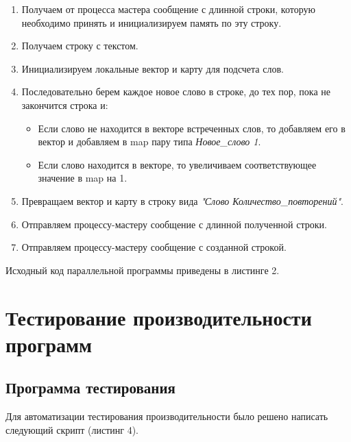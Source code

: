 \documentclass[12pt,a4paper]{report}
\begin{document}
\begin{enumerate}
							\begin{enumerate}
								\item Получаем от процесса мастера сообщение с длинной строки, которую необходимо принять и инициализируем память по эту строку.
								\item Получаем строку с текстом.
								\item Инициализируем локальные вектор и карту для подсчета слов.
								\item Последовательно берем каждое новое слово в строке, до тех пор, пока не закончится строка и:
									\begin{itemize}
										\item Если слово не находится в векторе встреченных слов, то добавляем его в вектор и добавляем в map пару типа \textit{Новое\_слово 1}.
										\item Если слово находится в векторе, то увеличиваем соответствующее значение в map на 1.
									\end{itemize}
								\item Превращаем вектор и карту в строку вида \textit{"Слово Количество\_повторений"}.
								\item Отправляем процессу-мастеру сообщение с длинной полученной строки.
								\item Отправляем процессу-мастеру сообщение с созданной строкой.
							\end{enumerate}
					\end{enumerate}
				
				Исходный код параллельной программы приведены в листинге 2.
				
		\section{Тестирование производительности программ}
			\subsection{Программа тестирования}
				Для автоматизации тестирования производительности было решено написать 
				следующий скрипт (листинг 4).
				
\end{document}
